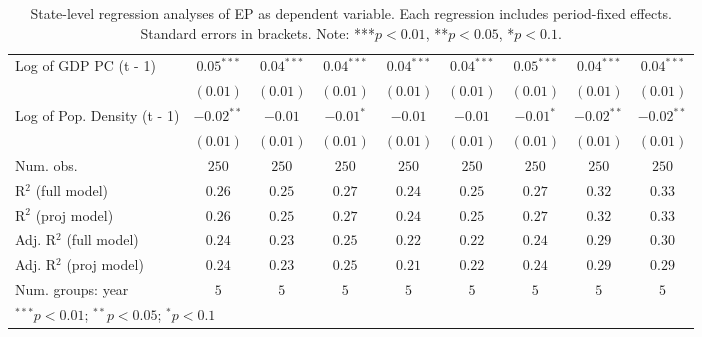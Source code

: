 \begin{table}
\begin{center}
\begin{tabular}{l c c c c c c c c}
Log of GDP PC (t - 1)             & $0.05^{***}$ & $0.04^{***}$ & $0.04^{***}$ & $0.04^{***}$ & $0.04^{***}$ & $0.05^{***}$ & $0.04^{***}$ & $0.04^{***}$ \\
                                  & $(0.01)$     & $(0.01)$     & $(0.01)$     & $(0.01)$     & $(0.01)$     & $(0.01)$     & $(0.01)$     & $(0.01)$     \\
Log of Pop. Density (t - 1)       & $-0.02^{**}$ & $-0.01$      & $-0.01^{*}$  & $-0.01$      & $-0.01$      & $-0.01^{*}$  & $-0.02^{**}$ & $-0.02^{**}$ \\
                                  & $(0.01)$     & $(0.01)$     & $(0.01)$     & $(0.01)$     & $(0.01)$     & $(0.01)$     & $(0.01)$     & $(0.01)$     \\
\hline
Num. obs.                         & $250$        & $250$        & $250$        & $250$        & $250$        & $250$        & $250$        & $250$        \\
R$^2$ (full model)                & $0.26$       & $0.25$       & $0.27$       & $0.24$       & $0.25$       & $0.27$       & $0.32$       & $0.33$       \\
R$^2$ (proj model)                & $0.26$       & $0.25$       & $0.27$       & $0.24$       & $0.25$       & $0.27$       & $0.32$       & $0.33$       \\
Adj. R$^2$ (full model)           & $0.24$       & $0.23$       & $0.25$       & $0.22$       & $0.22$       & $0.24$       & $0.29$       & $0.30$       \\
Adj. R$^2$ (proj model)           & $0.24$       & $0.23$       & $0.25$       & $0.21$       & $0.22$       & $0.24$       & $0.29$       & $0.29$       \\
Num. groups: year                 & $5$          & $5$          & $5$          & $5$          & $5$          & $5$          & $5$          & $5$          \\
\hline
\multicolumn{9}{l}{\scriptsize{$^{***}p<0.01$; $^{**}p<0.05$; $^{*}p<0.1$}}
\end{tabular}
\caption{State-level regression analyses of EP as dependent variable. Each regression includes period-fixed effects. Standard errors in brackets. Note: ***$p<0.01$, **$p<0.05$, *$p<0.1$.}
\label{tab:epi_3}
\end{center}
\end{table}

